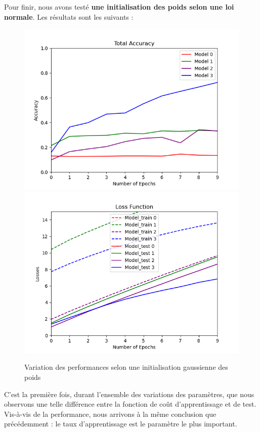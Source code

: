 \documentclass[a4paper]{article}
\begin{document}
		\newpage
		Pour finir, nous avons testé \textbf{une initialisation des poids selon une loi normale}. Les résultats sont les suivants : 
		\begin{figure}[!ht]
			\centering
			\includegraphics[width=.5\textwidth]{Fig_p4_acc_gauss.png}\hfill
			\includegraphics[width=.5\textwidth]{Fig_p4_losses_goss.png}\hfill
			\caption{Variation des performances selon une initialisation gaussienne des poids}	
		\end{figure}
		
		C'est la première fois, durant l'ensemble des variations des paramètres, que nous observons une telle différence entre la fonction de coût d'apprentissage et de test. Vis-à-vis de la performance, nous arrivons à la même conclusion que précédemment : le taux d'apprentissage est le paramètre le plus important.
\end{document}
